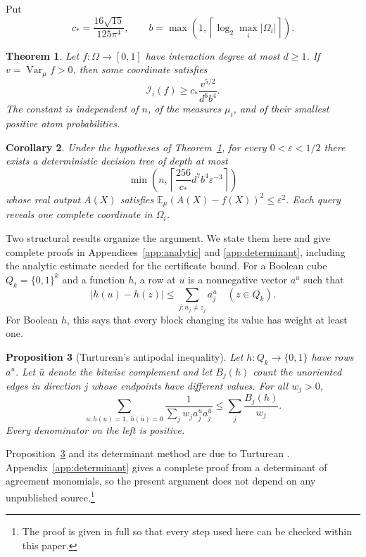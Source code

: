 \documentclass[11pt,reqno]{amsart}
\newtheorem{theorem}{Theorem}[section]
\newtheorem{proposition}[theorem]{Proposition}
\newtheorem{corollary}[theorem]{Corollary}
\theoremstyle{definition}
\theoremstyle{remark}
\newcommand{\E}{\mathbb E}
\newcommand{\Var}{\operatorname{Var}}
\newcommand{\cI}{\mathcal I}
\newcommand{\eps}{\varepsilon}
\numberwithin{equation}{section}
\begin{document}
Put
\begin{equation}\label{eq:constant}
 c_* =\frac{16\sqrt{15}}{125\pi^4},\qquad
 b=\max\left(1,\left\lceil\log_2\max_i|\Omega_i|\right\rceil\right).
\end{equation}

\begin{theorem}\label{thm:main}
Let $f\colon\Omega\to[0,1]$ have interaction degree at most $d\ge1$.
If $v=\Var_\mu f>0$, then some coordinate satisfies
\begin{equation}\label{eq:main}
 \cI_i(f)\ge c_*\frac{v^{5/2}}{d^6b^4}.
\end{equation}
The constant is independent of $n$, of the measures $\mu_i$, and of their
smallest positive atom probabilities.
\end{theorem}

\begin{corollary}\label{cor:query}
Under the hypotheses of Theorem~\ref{thm:main}, for every
$0<\eps<1/2$ there exists a deterministic decision tree of depth at most
\[
 \min\left(n,\left\lceil\frac{256}{c_*}d^7b^4\eps^{-3}\right\rceil\right)
\]
whose real output $A(X)$ satisfies $\E_\mu(A(X)-f(X))^2\le\eps^2$.
Each query reveals one complete coordinate in $\Omega_i$.
\end{corollary}

Two structural results organize the argument. We state them here and
give complete proofs in Appendices~\ref{app:analytic} and
\ref{app:determinant}, including the analytic estimate needed for the
certificate bound.
For a Boolean cube $Q_k=\{0,1\}^k$ and a function $h$, a row at $u$ is a
nonnegative vector $a^u$ such that
\[
 |h(u)-h(z)|\le\sum_{j:u_j\ne z_j}a_j^u\quad(z\in Q_k).
\]
For Boolean $h$, this says that every block changing its value has weight
at least one.

\begin{proposition}[Turturean's antipodal inequality]\label{prop:external}
Let $h\colon Q_k\to\{0,1\}$ have rows $a^u$. Let $\bar u$ denote the bitwise
complement and let $B_j(h)$ count the unoriented edges in direction $j$
whose endpoints have different values. For all $w_j>0$,
\begin{equation}\label{eq:antipodal}
 \sum_{u:h(u)=1,\ h(\bar u)=0}
 \frac{1}{\sum_j w_j a_j^u a_j^{\bar u}}
 \le\sum_j\frac{B_j(h)}{w_j}.
\end{equation}
Every denominator on the left is positive.
\end{proposition}

Proposition~\ref{prop:external} and its determinant method are due to
Turturean \cite{Turturean}. Appendix~\ref{app:determinant} gives a complete
proof from a determinant of agreement monomials, so the present argument
does not depend on any unpublished source.\footnote{The proof is given in
full so that every step used here can be checked within this paper.}
\end{document}
